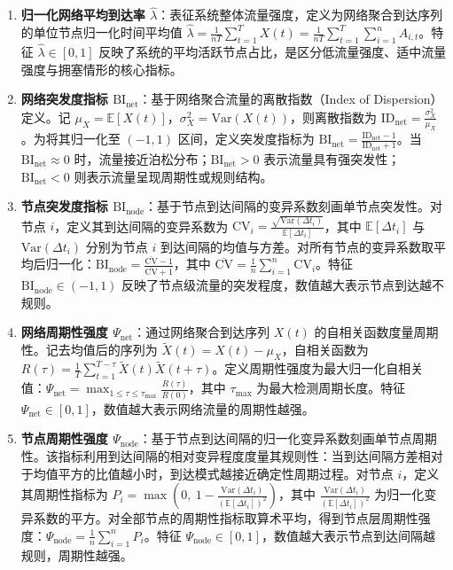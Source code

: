 \begin{enumerate}[leftmargin=*]
	\item \textbf{归一化网络平均到达率 $\hat{\lambda}$}：表征系统整体流量强度，定义为网络聚合到达序列的单位节点归一化时间平均值 $\hat{\lambda} = \frac{1}{nT} \sum_{t=1}^{T} X(t) = \frac{1}{nT} \sum_{t=1}^{T} \sum_{i=1}^{n} A_{i,t}$。特征 $\hat{\lambda} \in [0, 1]$ 反映了系统的平均活跃节点占比，是区分低流量强度、适中流量强度与拥塞情形的核心指标。
	
	\item \textbf{网络突发度指标 $\mathrm{BI}_{\mathrm{net}}$}：基于网络聚合流量的离散指数（Index of Dispersion）定义。记 $\mu_X = \mathbb{E}[X(t)]$，$\sigma_X^2 = \mathrm{Var}(X(t))$，则离散指数为 $\mathrm{ID}_{\mathrm{net}} = \frac{\sigma_X^2}{\mu_X}$。为将其归一化至 $(-1, 1)$ 区间，定义突发度指标为 $\mathrm{BI}_{\mathrm{net}} = \frac{\mathrm{ID}_{\mathrm{net}} - 1}{\mathrm{ID}_{\mathrm{net}} + 1}$。当 $\mathrm{BI}_{\mathrm{net}} \approx 0$ 时，流量接近泊松分布；$\mathrm{BI}_{\mathrm{net}} > 0$ 表示流量具有强突发性；$\mathrm{BI}_{\mathrm{net}} < 0$ 则表示流量呈现周期性或规则结构。
	
	\item \textbf{节点突发度指标 $\mathrm{BI}_{\mathrm{node}}$}：基于节点到达间隔的变异系数刻画单节点突发性。对节点 $i$，定义其到达间隔的变异系数为 $\mathrm{CV}_i = \frac{\sqrt{\mathrm{Var}(\Delta t_i)}}{\mathbb{E}[\Delta t_i]}$，其中 $\mathbb{E}[\Delta t_i]$ 与 $\mathrm{Var}(\Delta t_i)$ 分别为节点 $i$ 到达间隔的均值与方差。对所有节点的变异系数取平均后归一化：$\mathrm{BI}_{\mathrm{node}} = \frac{\overline{\mathrm{CV}} - 1}{\overline{\mathrm{CV}} + 1}$，其中 $\overline{\mathrm{CV}} = \frac{1}{n} \sum_{i=1}^{n} \mathrm{CV}_i$。特征 $\mathrm{BI}_{\mathrm{node}} \in (-1, 1)$ 反映了节点级流量的突发程度，数值越大表示节点到达越不规则。
	
	\item \textbf{网络周期性强度 $\Psi_{\mathrm{net}}$}：通过网络聚合到达序列 $X(t)$ 的自相关函数度量周期性。记去均值后的序列为 $\tilde{X}(t) = X(t) - \mu_X$，自相关函数为 $R(\tau) = \frac{1}{T} \sum_{t=1}^{T-\tau} \tilde{X}(t) \tilde{X}(t+\tau)$。定义周期性强度为最大归一化自相关值：$\Psi_{\mathrm{net}} = \max_{1 \le \tau \le \tau_{\max}} \frac{R(\tau)}{R(0)}$，其中 $\tau_{\max}$ 为最大检测周期长度。特征 $\Psi_{\mathrm{net}} \in [0, 1]$，数值越大表示网络流量的周期性越强。
	
	\item \textbf{节点周期性强度 $\Psi_{\mathrm{node}}$}：基于节点到达间隔的归一化变异系数刻画单节点周期性。该指标利用到达间隔的相对变异程度度量其规则性：当到达间隔方差相对于均值平方的比值越小时，到达模式越接近确定性周期过程。对节点 $i$，定义其周期性指标为 $P_i = \max\left(0,\ 1 - \frac{\mathrm{Var}(\Delta t_i)}{\left(\mathbb{E}[\Delta t_i]\right)^2}\right)$，其中 $\frac{\mathrm{Var}(\Delta t_i)}{\left(\mathbb{E}[\Delta t_i]\right)^2}$ 为归一化变异系数的平方。对全部节点的周期性指标取算术平均，得到节点层周期性强度：$\Psi_{\mathrm{node}} = \frac{1}{n} \sum_{i=1}^{n} P_i$。特征 $\Psi_{\mathrm{node}} \in [0, 1]$，数值越大表示节点到达间隔越规则，周期性越强。
\end{enumerate}

